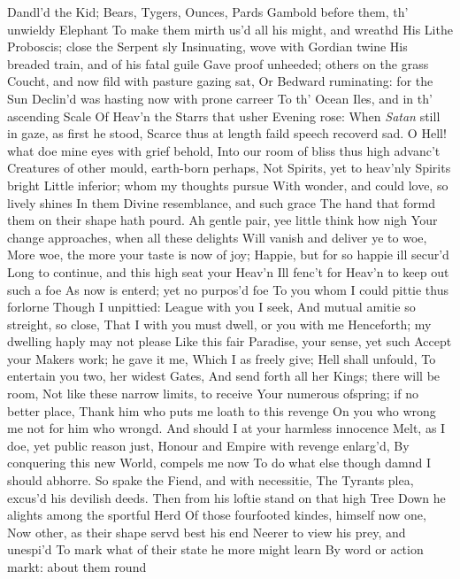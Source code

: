 \documentclass[11pt]{book}
\newcounter {first}
\begin{document}
Dandl'd the Kid; Bears, Tygers, Ounces, Pards 
Gambold before them, th' unwieldy Elephant 
To make them mirth us'd all his might, and wreathd 
His Lithe Proboscis; close the Serpent sly 
Insinuating, wove with Gordian twine 
His breaded train, and of his fatal guile 
Gave proof unheeded; others on the grass 
Coucht, and now fild with pasture gazing sat, 
Or Bedward ruminating: for the Sun 
Declin'd was hasting now with prone carreer 
To th' Ocean Iles, and in th' ascending Scale 
Of Heav'n the Starrs that usher Evening rose: 
When \textit{Satan} still in gaze, as first he stood, 
Scarce thus at length faild speech recoverd sad. 
\quad O Hell! what doe mine eyes with grief behold, 
Into our room of bliss thus high advanc't 
Creatures of other mould, earth-born perhaps, 
Not Spirits, yet to heav'nly Spirits bright 
Little inferior; whom my thoughts pursue 
With wonder, and could love, so lively shines 
In them Divine resemblance, and such grace 
The hand that formd them on their shape hath pourd. 
Ah gentle pair, yee little think how nigh 
Your change approaches, when all these delights 
Will vanish and deliver ye to woe, 
More woe, the more your taste is now of joy; 
Happie, but for so happie ill secur'd 
Long to continue, and this high seat your Heav'n 
Ill fenc't for Heav'n to keep out such a foe 
As now is enterd; yet no purpos'd foe 
To you whom I could pittie thus forlorne 
Though I unpittied: League with you I seek, 
And mutual amitie so streight, so close, 
That I with you must dwell, or you with me 
Henceforth; my dwelling haply may not please 
Like this fair Paradise, your sense, yet such 
Accept your Makers work; he gave it me, 
Which I as freely give; Hell shall unfould, 
To entertain you two, her widest Gates, 
And send forth all her Kings; there will be room, 
Not like these narrow limits, to receive 
Your numerous ofspring; if no better place, 
Thank him who puts me loath to this revenge 
On you who wrong me not for him who wrongd. 
And should I at your harmless innocence 
Melt, as I doe, yet public reason just, 
Honour and Empire with revenge enlarg'd, 
By conquering this new World, compels me now 
To do what else though damnd I should abhorre. 
\quad So spake the Fiend, and with necessitie, 
The Tyrants plea, excus'd his devilish deeds. 
Then from his loftie stand on that high Tree 
Down he alights among the sportful Herd 
Of those fourfooted kindes, himself now one, 
Now other, as their shape servd best his end 
Neerer to view his prey, and unespi'd 
To mark what of their state he more might learn 
By word or action markt: about them round 
\end{document}

